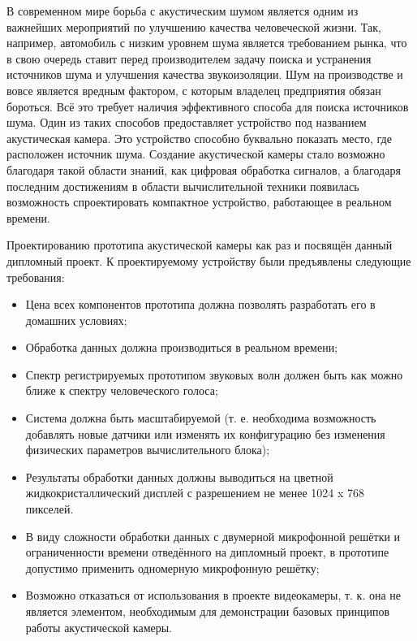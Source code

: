 В современном мире борьба с акустическим шумом является одним из важнейших мероприятий по улучшению качества человеческой жизни. Так, например, автомобиль с низким уровнем шума является требованием рынка, что в свою очередь ставит перед производителем задачу поиска и устранения источников шума и улучшения качества звукоизоляции. Шум на производстве и вовсе является вредным фактором, с которым владелец предприятия обязан бороться. Всё это требует наличия эффективного способа для поиска источников шума. Один из таких способов предоставляет устройство под названием акустическая камера. Это устройство способно буквально показать место, где расположен источник шума. Создание акустической камеры стало возможно благодаря такой области знаний, как цифровая обработка сигналов, а благодаря последним достижениям в области вычислительной техники появилась возможность спроектировать компактное устройство, работающее в реальном времени.

Проектированию прототипа акустической камеры как раз и посвящён данный дипломный проект. К проектируемому устройству были предъявлены следующие требования:
\begin{itemize}
	\item Цена всех компонентов прототипа должна позволять разработать его в домашних условиях;
	\item Обработка данных должна производиться в реальном времени;
	\item Спектр регистрируемых прототипом звуковых волн должен быть как можно ближе к спектру человеческого голоса;
	\item Система должна быть масштабируемой (т. е. необходима возможность добавлять новые датчики или изменять их конфигурацию без изменения физических параметров вычислительного блока);
	\item Результаты обработки данных должны выводиться на цветной жидкокристаллический дисплей с разрешением не менее 1024 x 768 пикселей.
	\item В виду сложности обработки данных с двумерной микрофонной решётки и ограниченности времени отведённого на дипломный проект, в прототипе допустимо применить одномерную микрофонную решётку;
	\item Возможно отказаться от использования в проекте видеокамеры, т. к. она не является элементом, необходимым для демонстрации базовых принципов работы акустической камеры.
\end{itemize}

